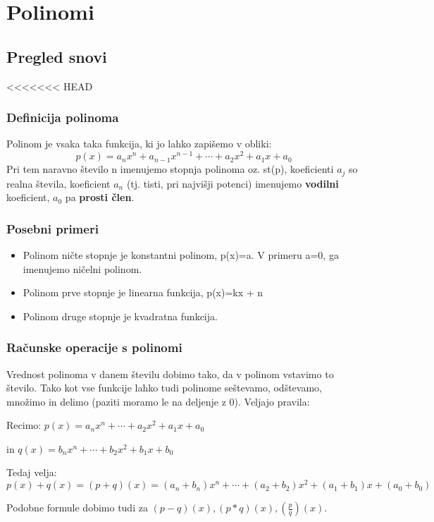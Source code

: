 \chapter{Polinomi}
\label{cha:polinomi}

\section{Pregled snovi}
\label{sec:polinomi-pregled-snovi}

<<<<<<< HEAD

\subsection{Definicija polinoma}
Polinom je vsaka taka funkcija, ki jo lahko zapišemo v obliki:
\[
p(x)=a_nx^n + a_{n-1}x^{n-1}+ \cdots + a_2x^2 + a_1 x + a_0
\]
Pri tem naravno število n imenujemo stopnja polinoma oz. st(p), koeficienti $ a_j$ so realna števila, koeficient $ a_n$ (tj. tisti, pri najvišji potenci) imenujemo \textbf{vodilni} koeficient, $ a_0$ pa \textbf{prosti člen}.
\subsection{Posebni primeri}
\begin{itemize}
\item Polinom ničte stopnje je konstantni polinom, p(x)=a. V primeru a=0, ga imenujemo ničelni polinom.
\item Polinom prve stopnje je linearna funkcija, p(x)=kx + n
\item Polinom druge stopnje je kvadratna funkcija.
\end{itemize}
\subsection{Računske operacije s polinomi}
Vrednost polinoma v danem številu dobimo tako, da v polinom vstavimo to število. 
Tako kot vse funkcije lahko tudi polinome seštevamo, odštevamo, množimo in delimo (paziti moramo le na deljenje z 0). Veljajo pravila:

Recimo: 
$ p(x)=a_nx^n + \cdots + a_2x^2 + a_1 x + a_0$ 

 in  
$ q(x)=b_nx^n + \cdots + b_2x^2 + b_1 x + b_0$ 

Tedaj velja:
$p(x) + q(x) = (p+q)(x) =(a_n + b_n)x^n +\cdots +(a_2 + b_2)x^2 +( a_1 + b_1) x + (a_0+b_0)$

Podobne formule dobimo tudi za $(p-q)(x), (p*q)(x), (\frac{p}{q})(x)$.
